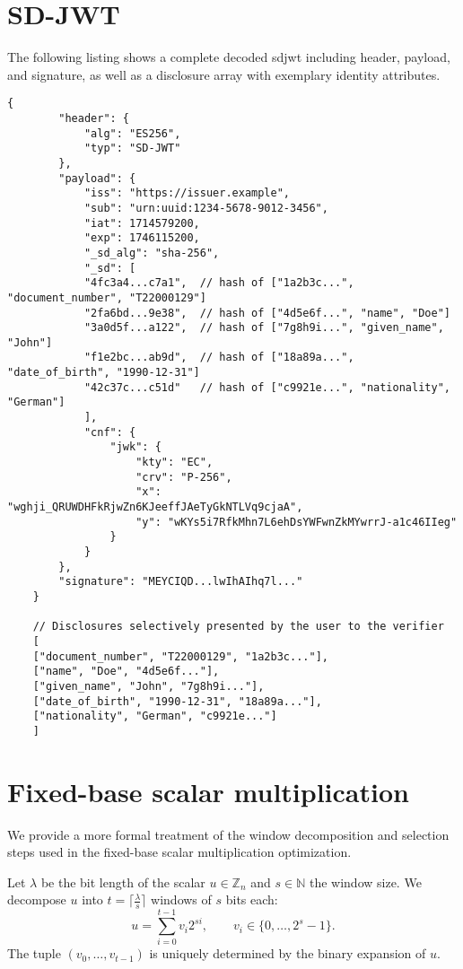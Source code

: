 \chapter{SD-JWT}
\label{app:sdjwt}
The following listing shows a complete decoded \acrshort{sdjwt} including header, payload, and signature, as well as a disclosure array with exemplary identity attributes.

\begin{lstlisting}[caption={Decoded \acrshort{sdjwt} and matching disclosures.}, label={lst:sdjwt-example}, breaklines=true]
	{
		"header": {
			"alg": "ES256",
			"typ": "SD-JWT"
		},
		"payload": {
			"iss": "https://issuer.example",
			"sub": "urn:uuid:1234-5678-9012-3456",
			"iat": 1714579200,
			"exp": 1746115200,
			"_sd_alg": "sha-256",
			"_sd": [
			"4fc3a4...c7a1",  // hash of ["1a2b3c...", "document_number", "T22000129"]
			"2fa6bd...9e38",  // hash of ["4d5e6f...", "name", "Doe"]
			"3a0d5f...a122",  // hash of ["7g8h9i...", "given_name", "John"]
			"f1e2bc...ab9d",  // hash of ["18a89a...", "date_of_birth", "1990-12-31"]
			"42c37c...c51d"   // hash of ["c9921e...", "nationality", "German"]
			],
			"cnf": {
				"jwk": {
					"kty": "EC",
					"crv": "P-256",
					"x": "wghji_QRUWDHFkRjwZn6KJeeffJAeTyGkNTLVq9cjaA",
					"y": "wKYs5i7RfkMhn7L6ehDsYWFwnZkMYwrrJ-a1c46IIeg"
				}
			}
		},
		"signature": "MEYCIQD...lwIhAIhq7l..."
	}
	
	// Disclosures selectively presented by the user to the verifier
	[
	["document_number", "T22000129", "1a2b3c..."],
	["name", "Doe", "4d5e6f..."],
	["given_name", "John", "7g8h9i..."],
	["date_of_birth", "1990-12-31", "18a89a..."],
	["nationality", "German", "c9921e..."]
	]
\end{lstlisting}

\chapter{Fixed-base scalar multiplication}
\label{app:fixed-base}
We provide a more formal treatment of the window decomposition and selection steps used in the fixed-base scalar multiplication optimization.

\begin{definition}
	Let $\lambda$ be the bit length of the scalar $u \in \mathbb{Z}_n$ and $s \in \mathbb{N}$ the window size.
	We decompose $u$ into $t=\lceil \tfrac{\lambda}{s}\rceil$ windows of $s$ bits each:
	\[
	u = \sum_{i=0}^{t-1} v_i 2^{si}, \qquad v_i \in \{0,\dots,2^s-1\}.
	\]
	The tuple $(v_0,\dots,v_{t-1})$ is uniquely determined by the binary expansion of $u$.
\end{definition}


